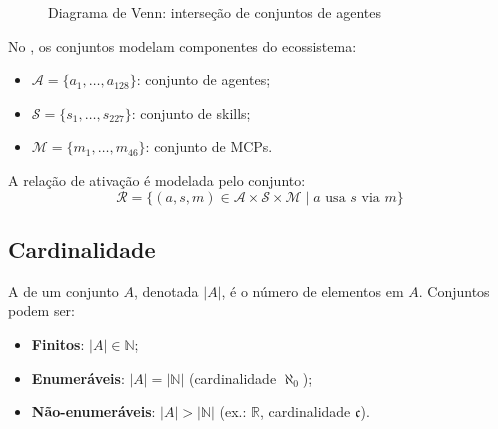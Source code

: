 \begin{figure}[htb]
    \centering
    \caption{Diagrama de Venn: interseção de conjuntos de agentes}
    \label{fig:venn-agentes}
\end{figure}

\begin{exemplo}
    No \opencodeeco, os conjuntos modelam componentes do ecossistema:
    \begin{itemize}
        \item $\mathcal{A} = \{a_1, \ldots, a_{128}\}$: conjunto de agentes;
        \item $\mathcal{S} = \{s_1, \ldots, s_{227}\}$: conjunto de skills;
        \item $\mathcal{M} = \{m_1, \ldots, m_{46}\}$: conjunto de MCPs.
    \end{itemize}
    A relação de ativação é modelada pelo conjunto:
    \[
    \mathcal{R} = \{(a, s, m) \in \mathcal{A} \times \mathcal{S} \times
    \mathcal{M} \mid a \text{ usa } s \text{ via } m\}
    \]
\end{exemplo}

\subsection{Cardinalidade}

\begin{definicao}[Cardinalidade]
    A  de um conjunto $A$, denotada $|A|$, é o
    número de elementos em $A$. Conjuntos podem ser:
    \begin{itemize}
        \item \textbf{Finitos}: $|A| \in \mathbb{N}$;
        \item \textbf{Enumeráveis}: $|A| = |\mathbb{N}|$ (cardinalidade
              $\aleph_0$);
        \item \textbf{Não-enumeráveis}: $|A| > |\mathbb{N}|$ (ex.:
              $\mathbb{R}$, cardinalidade $\mathfrak{c}$).
    \end{itemize}
\end{definicao}

